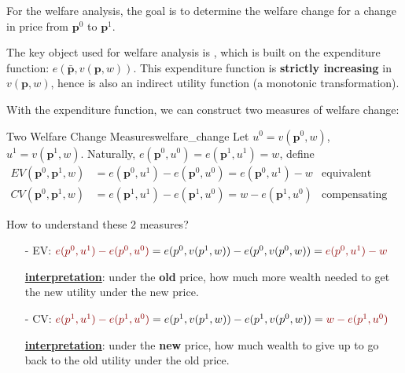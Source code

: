 For the welfare analysis, the goal is to determine the welfare change for a change in price from $\mathbf{p}^0$ to $\mathbf{p}^1$.

The key object used for welfare analysis is , which is built on the expenditure function: $e(\bar{\mathbf{p}},v(\mathbf{p},w))$. This expenditure function is \textbf{strictly increasing} in $v(\mathbf{p},w)$, hence is also an indirect utility function (a monotonic transformation).

With the expenditure function, we can construct two measures of welfare change:
\begin{definition}{Two Welfare Change Measures}{welfare_change}
    Let $u^0 = v(\mathbf{p}^0,w)$, $u^1 = v(\mathbf{p}^1,w)$. Naturally, $e(\mathbf{p}^0,u^0)=e(\mathbf{p}^1,u^1)=w$, define
    \begin{align*}
        EV(\mathbf{p}^0,\mathbf{p}^1,w) &=e(\mathbf{p}^0,u^1)-e(\mathbf{p}^0,u^0)=e(\mathbf{p}^0,u^1)-w & \text{equivalent variation}\\
        CV(\mathbf{p}^0,\mathbf{p}^1,w) &=e(\mathbf{p}^1,u^1)-e(\mathbf{p}^1,u^0)=w-e(\mathbf{p}^1,u^0) & \text{compensating variation}
    \end{align*}
\end{definition}

How to understand these 2 measures?

\begin{itemize}
    \item[-] EV: ${\color{red!55!black}e(p^0,u^1)-e(p^0,u^0)} = e(p^0,v(p^1,w))-e(p^0,v(p^0,w)) = {\color{red!55!black}e(p^0,u^1)-w}$
    
    \underline{\textbf{interpretation}}: under the \textbf{old} price, how much more wealth needed to get the new utility under the new price.
    
    \item[-] CV: ${\color{red!55!black}e(p^1,u^1)-e(p^1,u^0)} = e(p^1,v(p^1,w))-e(p^1,v(p^0,w)) = {\color{red!55!black}w- e(p^1,u^0)}$
    
    \underline{\textbf{interpretation}}: under the \textbf{new} price, how much wealth to give up to go back to the old utility under the old price.
\end{itemize}
